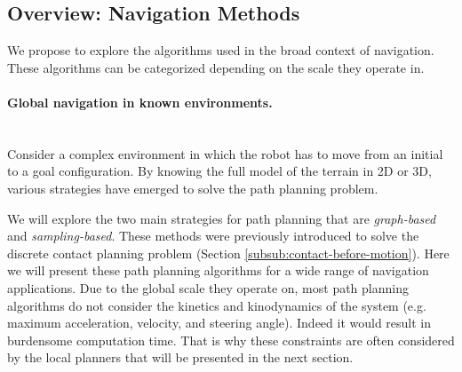 \subsection{Overview: Navigation Methods\label{subsub:nav:overview}}
We propose to explore the algorithms used in the broad context of navigation.
These algorithms can be categorized depending on the scale they operate in.

\paragraph{Global navigation in known environments.}\mbox{}\\

Consider a complex environment in which the robot has to move from an initial to a goal configuration.
By knowing the full model of the terrain in 2D or 3D, various strategies have emerged to solve the path planning problem.

We will explore the two main strategies for path planning that are \textit{graph-based} and \textit{sampling-based}.
These methods were previously introduced to solve the discrete contact planning problem (Section \ref{subsub:contact-before-motion}).
Here we will present these path planning algorithms for a wide range of navigation applications.
Due to the global scale they operate on, most path planning algorithms do not consider the kinetics and kinodynamics of the system (e.g. maximum acceleration, velocity, and steering angle). 
Indeed it would result in burdensome computation time. 
That is why these constraints are often considered by the local planners that will be presented in the next section.\\

